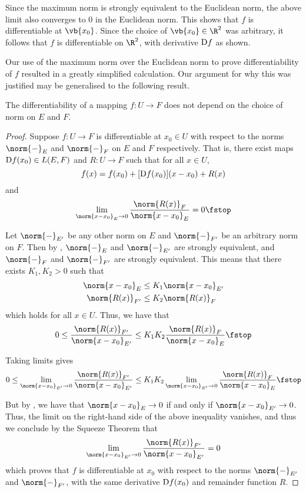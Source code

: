 Since the maximum norm is strongly equivalent to the Euclidean norm, the above limit also converges to 0 in the Euclidean norm. This shows that \( f \) is differentiable at \( \vb{x_0} \). Since the choice of \( \vb{x_0}\in\R^2 \) was arbitrary, it follows that \( f \) is differentiable on \( \R^2 \), with derivative \( \text{D} f \) as  shown.

\vspace{3mm}

Our use of the maximum norm over the Euclidean norm to prove differentiability of \( f \) resulted in a greatly simplified calculation. Our argument for why this was justified may be generalised to the following result.

\begin{proposition}
  \label{thm:diff-norm-inv}
  The differentiability of a mapping \( f:U\to F \) does not depend on the choice of norm on \( E \) and \( F \).
\end{proposition}
\begin{proof}
  Suppose \( f:U\to F \) is differentiable at \( x_0\in U \) with respect to the norms \( \norm{-}_E \) and \( \norm{-}_F \) on \( E \) and \( F \) respectively. That is, there exist maps \( \text{D} f(x_0)\in L(E,F) \) and \( R:U\to F \) such that for all \( x\in U \),
  \[ f(x)=f(x_0)+[\text{D} f(x_0)](x-x_0)+R(x) \]
  and
  \[ \lim_{\norm{x-x_0}_E\to 0}\frac{\norm{R(x)}_F}{\norm{x-x_0}_E}=0\fstop \]

  Let \( \norm{-}_{E'} \) be any other norm on \( E \) and \( \norm{-}_{F'} \) be an arbitrary norm on \( F \). Then by , \( \norm{-}_E\) and \( \norm{-}_{E'} \) are strongly equivalent, and \( \norm{-}_F \) and \( \norm{-}_{F'} \) are strongly equivalent. This means that there exists \( K_1,K_2>0 \) such that
  \begin{align*}
    \norm{x-x_0}_E&\leq K_1\norm{x-x_0}_{E'}\\
    \norm{R(x)}_{F'}&\leq K_2\norm{R(x)}_F
  \end{align*}
  which holds for all \( x\in U \). Thus, we have that
  \[ 0\leq \frac{\norm{R(x)}_{F'}}{\norm{x-x_0}_{E'}}\leq K_1K_2\frac{\norm{R(x)}_F}{\norm{x-x_0}_E}\fstop \]

  Taking limits gives
  \[  0\leq \lim_{\norm{x-x_0}_{E'}\to 0}\frac{\norm{R(x)}_{F'}}{\norm{x-x_0}_{E'}}\leq K_1K_2\lim_{\norm{x-x_0}_{E'}\to 0}\frac{\norm{R(x)}_F}{\norm{x-x_0}_E}\fstop \]

  But by , we have that \( \norm{x-x_0}_E\to 0 \) if and only if \( \norm{x-x_0}_{E'}\to 0 \). Thus, the limit on the right-hand side of the above inequality vanishes, and thus we conclude by the Squeeze Theorem that
  \[ \lim_{\norm{x-x_0}_{E'}\to 0}\frac{\norm{R(x)}_{F'}}{\norm{x-x_0}_{E'}}=0 \]
  which proves that \( f \) is differentiable at \( x_0 \) with respect to the norms \( \norm{-}_{E'} \) and \( \norm{-}_{F'} \), with the same derivative \( \text{D} f(x_0) \) and remainder function \( R \).
\end{proof}


